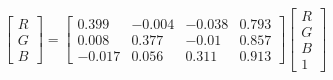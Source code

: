 \begin{equation}
\begin{bmatrix}
  R \\ G \\ B 
\end{bmatrix}=
\left[\begin{matrix}0.399 & -0.004 & -0.038 & 0.793\\ 
0.008 & 0.377 & -0.01 & 0.857\\ 
-0.017 & 0.056 & 0.311 & 0.913\end{matrix}\right]
\begin{bmatrix}
  R \\ G \\ B \\ 1 
\end{bmatrix}
\end{equation}
